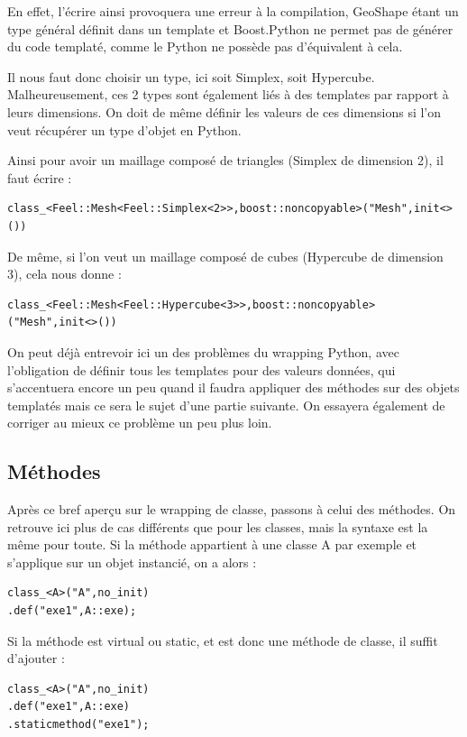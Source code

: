 \documentclass[french,12pt]{article}
\begin{document}
En effet, l'écrire ainsi provoquera une erreur à la compilation, GeoShape étant un type général définit dans un template et Boost.Python ne permet pas de générer du code templaté, comme le Python ne possède pas d'équivalent à cela.

Il nous faut donc choisir un type, ici soit Simplex, soit Hypercube. Malheureusement, ces 2 types sont également liés à des templates par rapport à leurs dimensions. On doit de même définir les valeurs de ces dimensions si l'on veut récupérer un type d'objet en Python.
\newline

Ainsi pour avoir un maillage composé de triangles (Simplex de dimension 2), il faut écrire :
\begin{lstlisting}
class_<Feel::Mesh<Feel::Simplex<2>>,boost::noncopyable>("Mesh",init<>())
\end{lstlisting}

De même, si l'on veut un maillage composé de cubes (Hypercube de dimension 3), cela nous donne :
\begin{lstlisting}
class_<Feel::Mesh<Feel::Hypercube<3>>,boost::noncopyable>("Mesh",init<>())
\end{lstlisting}

On peut déjà entrevoir ici un des problèmes du wrapping Python, avec l'obligation de définir tous les templates pour des valeurs données, qui s'accentuera encore un peu quand il faudra appliquer des méthodes sur des objets templatés mais ce sera le sujet d'une partie suivante. On essayera également de corriger au mieux ce problème un peu plus loin.

\subsection{Méthodes}

Après ce bref aperçu sur le wrapping de classe, passons à celui des méthodes. On retrouve ici plus de cas différents que pour les classes, mais la syntaxe est la même pour toute.
\newline
Si la méthode appartient à une classe A par exemple et s'applique sur un objet instancié, on a alors :
\begin{lstlisting}
class_<A>("A",no_init)
.def("exe1",A::exe);
\end{lstlisting}

Si la méthode est virtual ou static, et est donc une méthode de classe, il suffit d'ajouter :
\begin{lstlisting}
class_<A>("A",no_init)
.def("exe1",A::exe)
.staticmethod("exe1");
\end{lstlisting}
\end{document}
